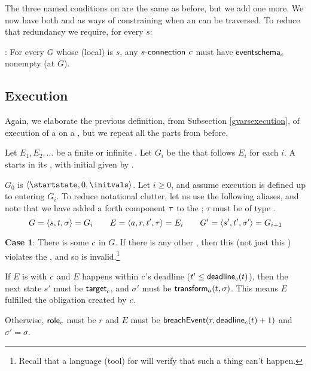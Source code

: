 \documentclass[12pt]{article}
\begin{document}
The three named conditions on \TGuards are the same as before, but we add one more. We now have both \EventSchema and \TGuards as ways of constraining when an \connection can be traversed. To reduce that redundancy we require, for every \State $s$:

\noindent {}: For every \GlobalState $G$ whose (local) \State is $s$, any \enabled $s\textsf{-connection}$ $c$ must have $\textsf{eventschema}_{c}$ nonempty (at $G$).
\medskip

\subsection{Execution} \label{schemasexecution}

Again, we elaborate the previous definition, from Subsection \ref{gvarsexecution}, of execution of a \Contract on a \trace, but we repeat all the parts from before.

\medskip

Let $E_1, E_2, \dots$ be a finite or infinite \trace. Let $G_i$ be the \GlobalState that follows $E_i$ for each $i$. A \Contract starts in its \startstate, with initial \gvarsassign given by \initvals.

$G_0$ is $\tup{\startstate, 0, \initvals}$.
Let $i \geq 0$, and assume execution is defined up to entering $G_i$. To reduce notational clutter, let us use the following aliases, and note that we have added a forth component $\tau$ to the \Event; $\tau$ must be of type .
\[ G = \langle s,t,\sigma\rangle = G_i  \qquad E = \langle a,r,t',\tau\rangle =  E_i \qquad  G' = \langle s',t', \sigma'\rangle = G_{i+1}\]

{\bf Case 1}: There is some \enabled \mustntran $c$ in $G$. If there is any other \enabled \connection, then this \Contract (not just this \trace) violates the \uaocz, and so is invalid.\footnote{Recall that a language (tool) for \Contracts will verify that such a thing can't happen.}
\begin{PPI}
    \item If $E$ is \compatible with $c$ and $E$ happens within $c$'s deadline ($t' \leq \textsf{deadline}_{c}(t)$), then the next state $s'$ must be $\textsf{target}_{c}$, and $\sigma'$ must be $\textsf{transform}_{a}(t,\sigma)$. This means $E$ fulfilled the obligation created by $c$.
    \item Otherwise, $\textsf{role}_{e}$ must be $r$ and $E$ must be $\textsf{breachEvent}(r,\textsf{deadline}_{c}(t) + 1)$ and $\sigma' = \sigma$. %
\end{PPI}
\end{document}
